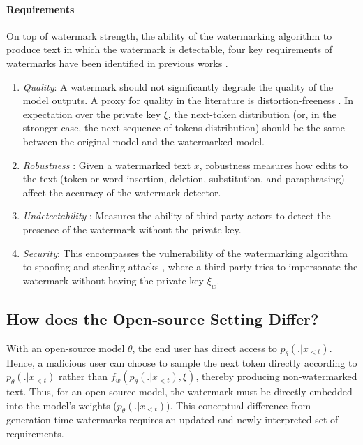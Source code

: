 \paragraph{Requirements} 
On top of watermark strength, \ie
the ability of the watermarking algorithm to produce text in which the watermark is detectable, four key requirements of watermarks have been identified in previous works \citep{stanford,unbiased,dipmark}.
\begin{enumerate}
    \item \emph{Quality}: A watermark should not significantly degrade the quality of the model outputs.  
    A proxy for quality in the literature is distortion-freeness \citep{stanford,unbiased,orzamir,dathathri2024scalable}.  
    In expectation over the private key $\xi$, the next-token distribution (or, in the stronger case, the next-sequence-of-tokens distribution) should be the same between the original model and the watermarked model.
    \item \emph{Robustness} \citep{kgw2}: Given a watermarked text $x$, robustness measures how edits to the text (\eg token or word insertion, deletion, substitution, and paraphrasing) affect the accuracy of the watermark detector.
    \item \emph{Undetectability} \citep{orzamir,crafted_prompt,detection}: Measures the ability of third-party actors to detect the presence of the watermark without the private key.  
    \item \emph{Security}: This encompasses the vulnerability of the watermarking algorithm to spoofing and stealing attacks \citep{watermark_stealing,bileve,strengths}, where a third party tries to impersonate the watermark without having the private key $\xi_w$.
\end{enumerate}


\subsection{How does the Open-source Setting Differ?}
\label{ssec:osm_watermark_requirements}

With an open-source model $\theta$, the end user has direct access to $p_{\theta}(.|x_{<t})$.
Hence, a malicious user can choose to sample the next token directly according to $p_{\theta}(.|x_{<t})$ rather than $f_w(p_{\theta}(.|x_{<t}), \xi)$, thereby producing non-watermarked text.
Thus, for an open-source model, the watermark must be directly embedded into the model's weights (\ie $p_{\theta}(.|x_{<t})$). 
This conceptual difference from generation-time watermarks requires an updated and newly interpreted set of requirements.

